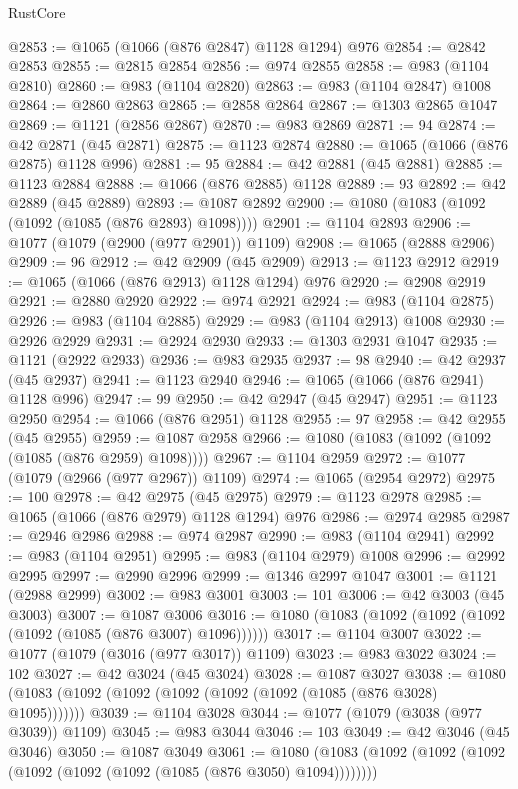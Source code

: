 \begin{lexlean}{RustCore}
\begin{coremodule}
@2853 := @1065 (@1066 (@876 @2847) @1128 @1294) @976
@2854 := @2842 @2853
@2855 := @2815 @2854
@2856 := @974 @2855
@2858 := @983 (@1104 @2810)
@2860 := @983 (@1104 @2820)
@2863 := @983 (@1104 @2847) @1008
@2864 := @2860 @2863
@2865 := @2858 @2864
@2867 := @1303 @2865 @1047
@2869 := @1121 (@2856 @2867)
@2870 := @983 @2869
@2871 := 94
@2874 := @42 @2871 (@45 @2871)
@2875 := @1123 @2874
@2880 := @1065 (@1066 (@876 @2875) @1128 @996)
@2881 := 95
@2884 := @42 @2881 (@45 @2881)
@2885 := @1123 @2884
@2888 := @1066 (@876 @2885) @1128
@2889 := 93
@2892 := @42 @2889 (@45 @2889)
@2893 := @1087 @2892
@2900 := @1080 (@1083 (@1092 (@1092 (@1085 (@876 @2893) @1098))))
@2901 := @1104 @2893
@2906 := @1077 (@1079 (@2900 (@977 @2901)) @1109)
@2908 := @1065 (@2888 @2906)
@2909 := 96
@2912 := @42 @2909 (@45 @2909)
@2913 := @1123 @2912
@2919 := @1065 (@1066 (@876 @2913) @1128 @1294) @976
@2920 := @2908 @2919
@2921 := @2880 @2920
@2922 := @974 @2921
@2924 := @983 (@1104 @2875)
@2926 := @983 (@1104 @2885)
@2929 := @983 (@1104 @2913) @1008
@2930 := @2926 @2929
@2931 := @2924 @2930
@2933 := @1303 @2931 @1047
@2935 := @1121 (@2922 @2933)
@2936 := @983 @2935
@2937 := 98
@2940 := @42 @2937 (@45 @2937)
@2941 := @1123 @2940
@2946 := @1065 (@1066 (@876 @2941) @1128 @996)
@2947 := 99
@2950 := @42 @2947 (@45 @2947)
@2951 := @1123 @2950
@2954 := @1066 (@876 @2951) @1128
@2955 := 97
@2958 := @42 @2955 (@45 @2955)
@2959 := @1087 @2958
@2966 := @1080 (@1083 (@1092 (@1092 (@1085 (@876 @2959) @1098))))
@2967 := @1104 @2959
@2972 := @1077 (@1079 (@2966 (@977 @2967)) @1109)
@2974 := @1065 (@2954 @2972)
@2975 := 100
@2978 := @42 @2975 (@45 @2975)
@2979 := @1123 @2978
@2985 := @1065 (@1066 (@876 @2979) @1128 @1294) @976
@2986 := @2974 @2985
@2987 := @2946 @2986
@2988 := @974 @2987
@2990 := @983 (@1104 @2941)
@2992 := @983 (@1104 @2951)
@2995 := @983 (@1104 @2979) @1008
@2996 := @2992 @2995
@2997 := @2990 @2996
@2999 := @1346 @2997 @1047
@3001 := @1121 (@2988 @2999)
@3002 := @983 @3001
@3003 := 101
@3006 := @42 @3003 (@45 @3003)
@3007 := @1087 @3006
@3016 := @1080 (@1083 (@1092 (@1092 (@1092 (@1092 (@1085 (@876 @3007) @1096))))))
@3017 := @1104 @3007
@3022 := @1077 (@1079 (@3016 (@977 @3017)) @1109)
@3023 := @983 @3022
@3024 := 102
@3027 := @42 @3024 (@45 @3024)
@3028 := @1087 @3027
@3038 := @1080 (@1083 (@1092 (@1092 (@1092 (@1092 (@1092 (@1085 (@876 @3028) @1095)))))))
@3039 := @1104 @3028
@3044 := @1077 (@1079 (@3038 (@977 @3039)) @1109)
@3045 := @983 @3044
@3046 := 103
@3049 := @42 @3046 (@45 @3046)
@3050 := @1087 @3049
@3061 := @1080 (@1083 (@1092 (@1092 (@1092 (@1092 (@1092 (@1092 (@1085 (@876 @3050) @1094))))))))

\end{coremodule}
\end{lexlean}

